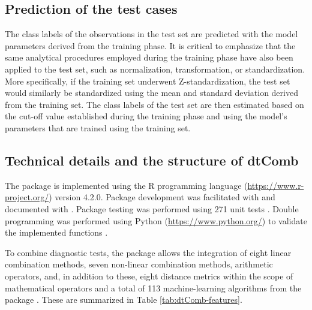 \subsection{Prediction of the test cases}\label{prediction-of-the-test-cases}

The class labels of the observations in the test set are predicted with the model parameters derived from the training phase. It is critical to emphasize that the same analytical procedures employed during the training phase have also been applied to the test set, such as normalization, transformation, or standardization. More specifically, if the training set underwent Z-standardization, the test set would similarly be standardized using the mean and standard deviation derived from the training set. The class labels of the test set are then estimated based on the cut-off value established during the training phase and using the model's parameters that are trained using the training set.

\subsection{Technical details and the structure of dtComb}\label{technical-details-and-the-structure-of-dtcomb}

The  package is implemented using the R programming language (\url{https://www.r-project.org/}) version 4.2.0. Package development was facilitated with  \citep{wickham2016devtools} and documented with  \citep{wickham2013roxygen2}. Package testing was performed using 271 unit tests \citep{wickham2011testthat}. Double programming was performed using Python (\url{https://www.python.org/}) to validate the implemented functions \citep{shiralkarprogramming}.

To combine diagnostic tests, the  package allows the integration of eight linear combination methods, seven non-linear combination methods, arithmetic operators, and, in addition to these, eight distance metrics within the scope of mathematical operators and a total of 113 machine-learning algorithms from the  package \citep{kuhn2008building}. These are summarized in Table \ref{tab:dtComb-features}.

